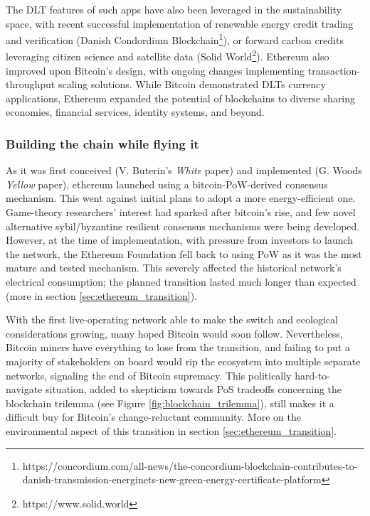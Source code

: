 \documentclass[11pt]{report}
\begin{document}
The \ac{DLT} features of such apps have also been leveraged in the sustainability space, with recent successful implementation of renewable energy credit trading and verification (Danish Condordium Blockchain\footnote{https://concordium.com/all-news/the-concordium-blockchain-contributes-to-danish-transmission-energinets-new-green-energy-certificate-platform}), or forward carbon credits leveraging citizen science and satellite data (Solid World\footnote{https://www.solid.world}). Ethereum also improved upon Bitcoin's design, with ongoing changes implementing transaction-throughput scaling solutions. While Bitcoin demonstrated \ac{DLT}s currency applications, Ethereum expanded the potential of blockchains to diverse sharing economies, financial services, identity systems, and beyond.

\subsubsection{Building the chain while flying it}
As it was first conceived (V. Buterin's \textit{White} paper) \cite{buterinEthereumNextgenerationSmart} and implemented (G. Woods \textit{Yellow} paper)\cite{woodEthereumSecuredDecentralised2023}, ethereum launched using a bitcoin-PoW-derived consensus mechanism. This went against initial plans to adopt a more energy-efficient one. Game-theory researchers' interest had sparked after bitcoin's rise, and few novel alternative sybil/byzantine resilient consensus mechanisms were being developed. However, at the time of implementation, with pressure from investors to launch the network, the Ethereum Foundation fell back to using PoW as it was the most mature and tested mechanism. This severely affected the historical network's electrical consumption; the planned transition lasted much longer than expected (more in section \ref{sec:ethereum_transition}).

With the first live-operating network able to make the switch and ecological considerations growing, many hoped Bitcoin would soon follow.  Nevertheless, Bitcoin miners have everything to lose from the transition, and failing to put a majority of stakeholders on board would rip the ecosystem into multiple separate networks, signaling the end of Bitcoin supremacy. This politically hard-to-navigate situation, added to skepticism towards PoS tradeoffs concerning the blockchain trilemma (see Figure \ref{fig:blockchain_trilemma}), still makes it a difficult buy for Bitcoin's change-reluctant community. More on the environmental aspect of this transition in section \ref{sec:ethereum_transition}.
\end{document}

